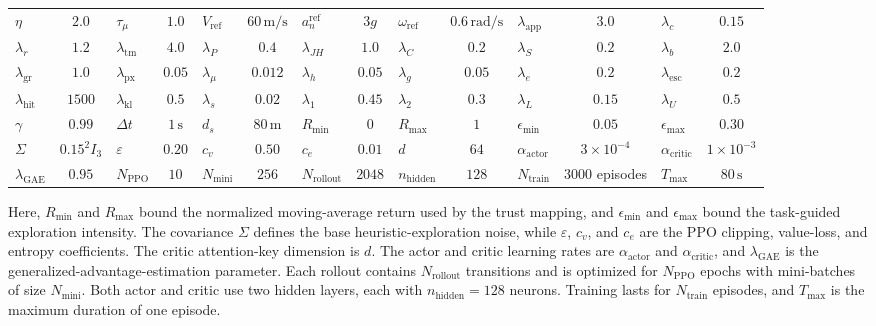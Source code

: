 \documentclass{cja}
\begin{document}
\begin{table}[!t]
{\begin{tabular}{@{}lc|lc|lc|lc|lc|lc|lc@{}}
$\eta$ & $2.0$ & $\tau_{\mu}$ & $1.0$ & $V_{\mathrm{ref}}$ & $60\,\mathrm{m/s}$ & $a_n^{\mathrm{ref}}$ & $3g$ & $\omega_{\mathrm{ref}}$ & $0.6\,\mathrm{rad/s}$ & $\lambda_{\mathrm{app}}$ & $3.0$ & $\lambda_c$ & $0.15$ \\
$\lambda_r$ & $1.2$ & $\lambda_{\mathrm{tm}}$ & $4.0$ & $\lambda_P$ & $0.4$ & $\lambda_{JH}$ & $1.0$ & $\lambda_C$ & $0.2$ & $\lambda_S$ & $0.2$ & $\lambda_b$ & $2.0$ \\
$\lambda_{\mathrm{gr}}$ & $1.0$ & $\lambda_{\mathrm{px}}$ & $0.05$ & $\lambda_{\mu}$ & $0.012$ & $\lambda_h$ & $0.05$ & $\lambda_g$ & $0.05$ & $\lambda_e$ & $0.2$ & $\lambda_{\mathrm{esc}}$ & $0.2$ \\
$\lambda_{\mathrm{hit}}$ & $1500$ & $\lambda_{\mathrm{kl}}$ & $0.5$ & $\lambda_s$ & $0.02$ & $\lambda_1$ & $0.45$ & $\lambda_2$ & $0.3$ & $\lambda_L$ & $0.15$ & $\lambda_U$ & $0.5$ \\
$\gamma$ & $0.99$ & $\Delta t$ & $1\,\mathrm{s}$ & $d_s$ & $80\,\mathrm{m}$ & $R_{\min}$ & $0$ & $R_{\max}$ & $1$ & $\epsilon_{\min}$ & $0.05$ & $\epsilon_{\max}$ & $0.30$ \\
$\Sigma$ & $0.15^2 I_3$ & $\varepsilon$ & $0.20$ & $c_v$ & $0.50$ & $c_e$ & $0.01$ & $d$ & $64$ & $\alpha_{\mathrm{actor}}$ & $3{\times}10^{-4}$ & $\alpha_{\mathrm{critic}}$ & $1{\times}10^{-3}$ \\
$\lambda_{\mathrm{GAE}}$ & $0.95$ & $N_{\mathrm{PPO}}$ & $10$ & $N_{\mathrm{mini}}$ & $256$ & $N_{\mathrm{rollout}}$ & $2048$ & $n_{\mathrm{hidden}}$ & $128$ & $N_{\mathrm{train}}$ & $3000$ episodes & $T_{\max}$ & $80\,\mathrm{s}$ \\
\bottomrule
\end{tabular}%
}
\end{table}

Here, $R_{\min}$ and $R_{\max}$ bound the normalized moving-average return used by the trust mapping, and $\epsilon_{\min}$ and $\epsilon_{\max}$ bound the task-guided exploration intensity. The covariance $\Sigma$ defines the base heuristic-exploration noise, while $\varepsilon$, $c_v$, and $c_e$ are the PPO clipping, value-loss, and entropy coefficients. The critic attention-key dimension is $d$. The actor and critic learning rates are $\alpha_{\mathrm{actor}}$ and $\alpha_{\mathrm{critic}}$, and $\lambda_{\mathrm{GAE}}$ is the generalized-advantage-estimation parameter. Each rollout contains $N_{\mathrm{rollout}}$ transitions and is optimized for $N_{\mathrm{PPO}}$ epochs with mini-batches of size $N_{\mathrm{mini}}$. Both actor and critic use two hidden layers, each with $n_{\mathrm{hidden}}=128$ neurons. Training lasts for $N_{\mathrm{train}}$ episodes, and $T_{\max}$ is the maximum duration of one episode.
\end{document}
